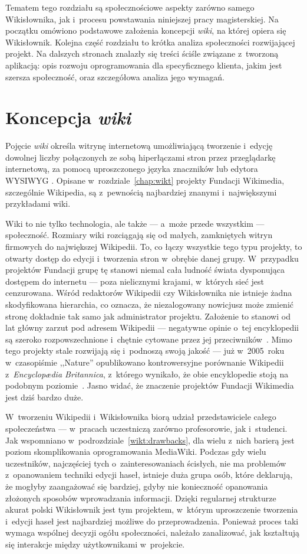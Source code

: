 Tematem tego rozdziału są społecznościowe aspekty zarówno samego Wikisłownika, jak i~procesu powstawania niniejszej pracy magisterskiej. Na początku omówiono podstawowe założenia koncepcji \emph{wiki}, na której opiera się Wikisłownik. Kolejna część rozdziału to krótka analiza społeczności rozwijającej projekt. Na dalszych stronach znalazły się treści ściśle związane z~tworzoną aplikacją: opis rozwoju oprogramowania dla specyficznego klienta, jakim jest szersza społeczność, oraz szczegółowa analiza jego wymagań.

\section{Koncepcja \emph{wiki}}
Pojęcie \emph{wiki} określa witrynę internetową umożliwiającą tworzenie i~edycję dowolnej liczby połączonych ze sobą hiperłączami stron przez przeglądarkę internetową, za pomocą uproszczonego języka znaczników lub edytora WYSIWYG \cite{britannica}. Opisane w~rozdziale~\ref{chap:wikt} projekty Fundacji Wikimedia, szczególnie Wikipedia, są z~pewnością najbardziej znanymi i~największymi przykładami wiki.

Wiki to nie tylko technologia, ale także --- a~może przede wszystkim --- społeczność. Rozmiary wiki rozciągają się od małych, zamkniętych witryn firmowych do największej Wikipedii. To, co łączy wszystkie tego typu projekty, to otwarty dostęp do edycji i~tworzenia stron w~obrębie danej grupy. W~przypadku projektów Fundacji grupę tę stanowi niemal cała ludność świata dysponująca dostępem do internetu --- poza nielicznymi krajami, w~których sieć jest cenzurowana. Wśród redaktorów Wikipedii czy Wikisłownika nie istnieje żadna skodyfikowana hierarchia, co oznacza, że niezalogowany nowicjusz może zmienić stronę dokładnie tak samo jak administrator projektu. Założenie to stanowi od lat główny zarzut pod adresem Wikipedii --- negatywne opinie o~tej encyklopedii są szeroko rozpowszechnione i~chętnie cytowane przez jej przeciwników~\cite{knol}. Mimo tego projekty stale rozwijają się i~podnoszą swoją jakość --- już w~2005~roku w~czasopiśmie ,,Nature'' opublikowano kontrowersyjne porównanie Wikipedii z~\emph{Encyclopædia Britannica}, z~którego wynikało, że obie encyklopedie stoją na podobnym poziomie~\cite{nature:britannica}. Jasno widać, że znaczenie projektów Fundacji Wikimedia jest dziś bardzo duże.

W~tworzeniu Wikipedii i~Wikisłownika biorą udział przedstawiciele całego społeczeństwa --- w~pracach uczestniczą zarówno profesorowie, jak i~studenci. Jak wspomniano w~podrozdziale~\ref{wikt:drawbacks}, dla wielu z~nich barierą jest poziom skomplikowania oprogramowania MediaWiki. Podczas gdy wielu uczestników, najczęściej tych o~zainteresowaniach ścisłych, nie ma problemów z~opanowaniem techniki edycji haseł, istnieje duża grupa osób, które deklarują, że mogłyby zaangażować się bardziej, gdyby nie konieczność opanowania złożonych sposobów wprowadzania informacji. Dzięki regularnej strukturze akurat polski Wikisłownik jest tym projektem, w~którym uproszczenie tworzenia i~edycji haseł jest najbardziej możliwe do przeprowadzenia. Ponieważ proces taki wymaga wspólnej decyzji ogółu społeczności, należało zanalizować, jak kształtują się interakcje między użytkownikami w~projekcie.

